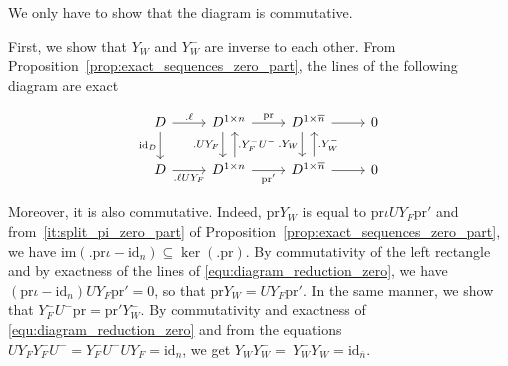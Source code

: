 \documentclass{ifacconf}
\newcommand\id[1]{\text{id}_{#1}}
\newcommand\im{\text{im}}
\newcommand\p{\text{pr}}
\begin{document}
\begin{pf}
  We only have to show that the diagram is commutative.

  First, we show that $Y_W$ and $Y_W^-$ are inverse to each other.
  From Proposition~\ref{prop:exact_sequences_zero_part}, the lines of the
  following diagram are exact
  \medskip
  \begin{center}
    \begin{equation}\label{equ:diagram_reduction_zero}
      \begin{tikzcd}
        D\arrow[r, ".\ell"] \arrow[d, "\id{D}"']&
        D^{1\times n}\arrow[r, "\p"] \arrow[d, ".UY_F"', shift right=1ex]&
        D^{1\times\overline{n}}\arrow[r] \arrow[d, ".Y_W"', shift right=1ex]&
        0
        \\
        D\arrow[r, ".\ell UY_F"'] &
        D^{1\times n}\arrow[r, "\p'"'] \arrow[u, ".Y_F^-U^-"', shift right=1ex]&
        D^{1\times\overline{n}}\arrow[r] \arrow[u, ".Y_W^-"', shift right=1ex]&
        0
      \end{tikzcd}
    \end{equation}
  \end{center}
  Moreover, it is also commutative. Indeed, $\p Y_W$ is equal to
  $\p\iota U Y_F\p'$ and from~\ref{it:split_pi_zero_part} of
  Proposition~\ref{prop:exact_sequences_zero_part}, we have $\im(.\p\iota
    -\id{n})\subseteq\ker(.\p)$. By commutativity of the left rectangle
  and by exactness of the lines of \eqref{equ:diagram_reduction_zero}, we
  have $(\p\iota-\id{n})UY_F\p'=0$, so that $\p Y_W=UY_F\p'$. In the
  same manner, we show that $Y_F^-U^-\p=\p' Y_W^- $. By commutativity
  and exactness of \eqref{equ:diagram_reduction_zero} and from the
  equations $UY_FY_F^-U^-=Y_F^-U^-UY_F=\id{n}$, we get $Y_WY_W^-=~Y_W^-
  Y_W=\id{\overline{n}}$.


\end{pf}
\end{document}
